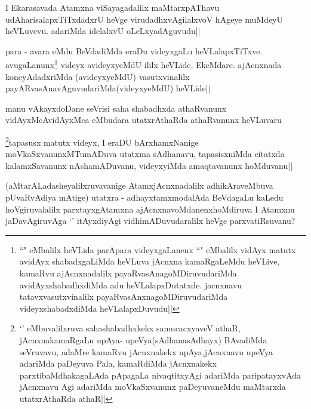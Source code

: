 \begin{artha}
I Ekarasavada Atamxna viSayagadalilx maMtarxpAThavu udAharisalapxTiTxdadxrU heVge virudadhxvAgilalxvoV hAgeye muMdeyU heVLuvevu. adariMda idelalxvU oLeLxyadAguvudu||
\end{artha}

\begin{artha}
para - avara eMdu BeVdadiMda eraDu videyxgaLu heVLalapxTiTxve. avugaLanunx\footnote{``\stext" eMbalilx heVLida parApara videyxgaLanenx ``\stext" eMbalilx vidAyx matutx avidAyx shabadxgaLiMda heVLuva jAcnxna kamaRgaLeMdu heVLive, kamaRvu ajAcnxnadalilx payaRvasAnagoMDiruvudariMda avidAyxshabadhxdiMda adu heVLalapxDutatxde. jacnxnavu tatavxvasutxvinalilx payaRvasAnxnagoMDiruvudariMda videyxshabadxdiMda heVLalapxDuvudu||} videyx avideyxyeMdU ililx heVLide, EkeMdare. ajAcnxnada koneyAdadxriMda (avideyxyeMdU) vasutxvinalilx payARvasAnavAguvudariMda(videyxyeMdU) heVLide||
\end{artha}


\begin{artha}
manu vAkayxdoDane seVrisi saha shabadhxda athaRvanunx vidAyxMcAvidAyxMca eMbudara utatxrAthaRda athaRvanunx heVLuvaru
\end{artha}



\begin{artha}
\footnote{`\stext' eMbuvalilxruva sahashabadhxkekx samucacxyaveV athaR, jAcnxnakamaRgaLu upAya- upeVya(sAdhanasAdhayx) BAvadiMda seVruvavu, adaMre kamaRvu jAcnxnakekx upAya,jAcnxnavu upeVya adariMda paDeyuva Pala, kamaRdiMda jAcnxnakekx   parxtibaMdhakagaLAda pApagaLa nivaqtitxyAgi adariMda paripatayxvAda jAcnxnavu Agi adariMda moVkaSxvanunx paDeyuvaneMdu maMtarxda utatxrAthaRda athaR||}tapasusx matutx videyx, I eraDU bArxhamxNanige moVkaSxvanunxMTumADuva utatxma sAdhanavu, tapasisxniMda citatxda kalamxSavanunx nAshamADuvanu, videyxyiMda amaqtavanunx hoMduvanu||
\end{artha}

\begin{artha}
(aMtarALadasheyalilxruvavanige AtamxjAcnxnadalilx adhikAraveMbuva pUvaRvAdiya mAtige) utatxra - adhayxtamxmodalAda BeVdagaLu kaLedu hoVgiruvalalilx parxtayxgAtamxna ajAcnxnavoMdanenxhoMdiruva I Atamxnu jaDavAgiruvAga `\stext' itAyxdiyAgi vidhimADuvudaralilx heVge parxvatiRsuvanu?
\end{artha}


